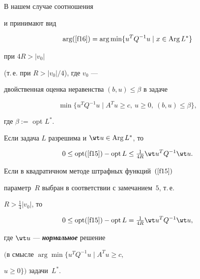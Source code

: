 \begin{note} В нашем случае соотношения


 и  принимают вид


\begin{equation}


\label{f17}


\arg\rf{f16} =\arg\min \{ u^T Q^{-1} u \mid x\in \Arg L^*\}


\end{equation}


при $4R>|v_0|$


(т.\,е.{} при $R>|v_0|/4$), где $v_0$ ---


двойственная оценка неравенства $(b, u)\le \beta$ в задаче


$$


\min \{ u^T Q^{-1} u \mid A^Tu\ge c,\ u\ge 0,\ (b, u)\le \beta\},


$$


где $\beta:=$ opt $L^*$.





Если задача $L$ разрешима и $\wt u\in\Arg L^*$, то


\begin{equation}


\label{f18}


0\le \opt\rf{f15} -\opt L \le \tfrac{1}{4R} 


\wt u^T Q^{-1} \wt u.


\end{equation}


\end{note}





\begin{thm}\label{t2}


Если в квадратичном методе штрафных функций~$\rf{f15}$


параметр~$R$ выбран в соответствии с замечанием~$5$, т.\,е.{}


$R>\frac{ 1}{ 4} |v_0|$, то


$$


0\le \opt\rf{f15} -\opt L = \tfrac{1}{4R} 


\wt u^T Q^{-1} \wt u,


$$


где $\wt u$ --- {\it\bf нормальное} решение


$($в смысле $\arg\min \{ u^T Q^{-1} u \mid A^Tu\ge c$,


$u\geq 0\})$ задачи~$L^*$.


\end{thm}





